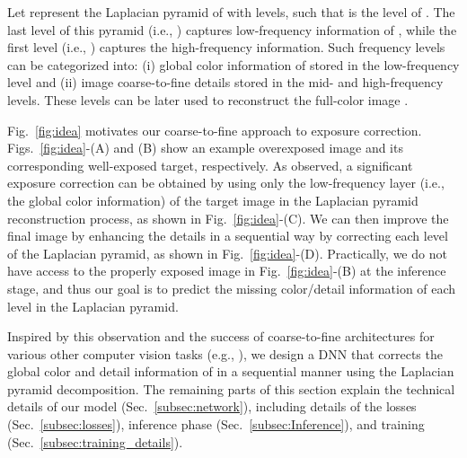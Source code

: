 \documentclass[final]{cvpr}
\begin{document}
Let  represent the Laplacian pyramid of  with  levels, such that   is the  level of . The last level of this pyramid (i.e., ) captures low-frequency information of , while the first level (i.e., ) captures the high-frequency information. Such frequency levels can be categorized into: (i) global color information of  stored in the low-frequency level and (ii) image coarse-to-fine details stored in the mid- and high-frequency levels. These levels can be later used to reconstruct the full-color image .

Fig.\ \ref{fig:idea} motivates our coarse-to-fine approach to exposure correction.  Figs.\ \ref{fig:idea}-(A) and (B) show an example overexposed image and its corresponding well-exposed target, respectively.
As observed, a significant exposure correction can be obtained by  using only the low-frequency layer (i.e., the global color information) of the target image in the Laplacian pyramid reconstruction process, as shown in Fig.~\ref{fig:idea}-(C). We can then improve the final image by enhancing the details in a sequential way by correcting each level of the Laplacian pyramid, as shown in Fig.~\ref{fig:idea}-(D). Practically, we do not have access to the properly exposed image in Fig.~\ref{fig:idea}-(B) at the inference stage, and thus our goal is to predict the missing color/detail information of each level in the Laplacian pyramid.

Inspired by this observation and the success of coarse-to-fine architectures for various other computer vision tasks (e.g., \cite{denton2015deep, shaham2019singan, lai2017deep, ma2020efficient}), we design a DNN that corrects the global color and detail information of  in a sequential manner using the Laplacian pyramid decomposition.
The remaining parts of this section explain the technical details of our model (Sec.\ \ref{subsec:network}), including details of the losses (Sec.\ \ref{subsec:losses}),
inference phase (Sec.\ \ref{subsec:Inference}), and training (Sec.\ \ref{subsec:training_details}).
\end{document}
